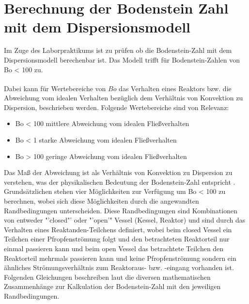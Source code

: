 \documentclass[12pt,liststotoc]{report}
\begin{document}
\newpage

\section{Berechnung der Bodenstein Zahl mit dem Dispersionsmodell}

Im Zuge des Laborpraktikums ist zu prüfen ob die Bodenstein-Zahl mit dem Dispersionsmodell berechenbar ist. Das Modell trifft für Bodenstein-Zahlen von Bo < 100 zu.
\\
\\
Dabei kann für Wertebereiche von $Bo$  das Verhalten eines Reaktors bzw. die Abweichung vom idealen Verhalten bezüglich dem Verhältnis von Konvektion zu Dispersion, beschrieben werden. Folgende Wertebereiche sind von Relevanz:


\begin{itemize}
    \item Bo < 100 mittlere Abweichung vom idealen Fließverhalten
    \item Bo < 1 starke Abweichung vom idealen Fließverhalten
    \item Bo > 100 geringe Abweichung vom idealen Fließverhalten 
\end{itemize}
\noindent
Das Maß der Abweichung ist als Verhältnis von Konvektion zu Dispersion zu verstehen, was der physikalischen Bedeutung der Bodenstein-Zahl entspricht \cite{fogler1999elements}. Grundsätzlichen stehen vier Möglichkeiten zur Verfügung um Bo < 100 zu berechnen, wobei sich diese Möglichkeiten durch die angewandten Randbedingungen unterscheiden. Diese Randbedingungen sind Kombinationen von entweder "'closed"' oder "'open'" Vessel (Kessel, Reaktor) und sind durch das Verhalten eines Reaktanden-Teilchens definiert, wobei beim closed Vessel ein Teilchen einer Pfropfenströmung folgt und den betrachteten Reaktorteil nur einmal passieren kann und beim open Vessel das betrachtete Teilchen den Reaktorteil mehrmals passieren kann und keine Pfropfenströmung sondern ein ähnliches Strömungsverhältnis zum Reaktoraus- bzw. -eingang vorhanden ist. Folgenden Gleichungen beschreiben laut \cite{Skript_2018} die diversen mathematischen Zusammenhänge zur Kalkulation der Bodenstein-Zahl mit den jeweiligen Randbedingungen.
\end{document}
